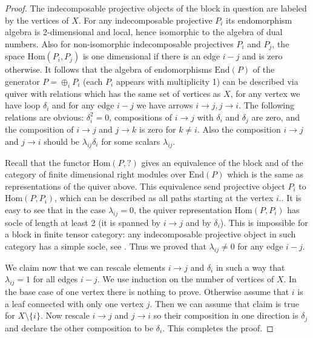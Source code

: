 \documentclass{amsart}
\theoremstyle{definition}
\newcommand{\Hom}{\mathrm{Hom}}
\newcommand{\End}{\text{End}}
\numberwithin{equation}{section}
\begin{document}
\begin{proof} The indecomposable projective objects of the block in question are labeled by the vertices
of $X$. For any indecomposable projective $P_i$ its endomorphism algebra is 2-dimensional and local,
hence isomorphic to the algebra of dual numbers. Also for non-isomorphic indecomposable projectives $P_i$ 
and $P_j$, the space $\Hom(P_i,P_j)$ is one dimensional if there is an edge $i-j$ and is zero otherwise.
It follows that the algebra of endomorphisms $\End(P)$ of the generator $P=\oplus_iP_i$
(each $P_i$ appears with multiplicity 1) can be described via quiver with relations which has the same set of
vertices as $X$, for any vertex we have loop $\delta_i$ and for any edge $i-j$ we have arrows $i\to j, j\to i$.
The following relations are obvious: $\delta_i^2=0$, compositions of $i\to j$ with $\delta_i$ and $\delta_j$
are zero, and the composition of $i\to j$ and $j\to k$ is zero for $k\ne i$. Also the composition $i\to j$ and
$j\to i$ should be $\lambda_{ij}\delta_i$ for some scalars $\lambda_{ij}$. 

Recall that the functor
$\Hom(P,?)$ gives an equivalence of the block and of the category of finite dimensional right modules
over $\End(P)$ which is the same as representations of the quiver above. This equivalence send projective object $P_i$ to $\Hom(P,P_i)$, which can be described as all paths starting at the vertex $i$.. It is easy to see that
in the case $\lambda_{ij}=0$, the quiver representation $\Hom(P,P_i)$ has socle of length at least 2 (it is spanned
by $i\to j$ and by $\delta_i$). This is impossible for a block in finite tensor category: any indecomposable projective object
in such category has a simple socle, see \cite[Remark 6.1.5]{EGNO}. Thus we proved that $\lambda_{ij}\ne 0$
for any edge $i-j$. 

We claim now that we can rescale elements $i\to j$ and $\delta_i$ in such a way that $\lambda_{ij}=1$ for
all edges $i-j$. We use induction on the number of vertices of $X$. In the base case of one vertex there is
nothing to prove. Otherwise assume that $i$ is a leaf connected with only one vertex $j$. Then we can assume
that claim is true for $X\setminus \{i\}$. Now rescale $i\to j$ and $j\to i$ so their composition in one direction is $\delta_j$
and declare the other composition to be $\delta_i$. This completes the proof.
\end{proof}
\end{document}
